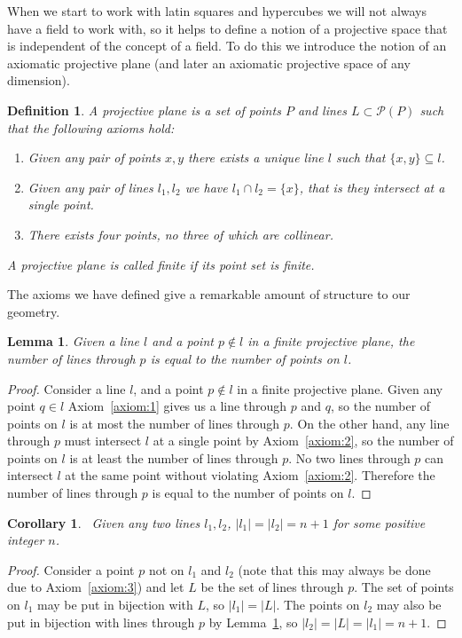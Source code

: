 \documentclass{article}
\newtheorem{lemma}{Lemma}
\newtheorem{corollary}{Corollary}
\newtheorem{definition}{Definition}
\begin{document}
When we start to work with latin squares and hypercubes we will not always have a field to work with, so it helps to define a notion of a projective space that is independent of the concept of a field. To do this we introduce the notion of an axiomatic projective plane (and later an axiomatic projective space of any dimension).

\begin{definition}
  A \textit{projective plane} is a set of points \(P\) and lines \(L \subset \mathcal{P}(P)\) such that the following axioms hold:

  \begin{enumerate}
    \item Given any pair of points \(x, y\) there exists a unique line \(l\) such that \(\{x, y\} \subseteq l\).\label{axiom:1}
    \item Given any pair of lines \(l_1, l_2\) we have \(l_1 \cap l_2 = \{x\}\), that is they intersect at a single point.\label{axiom:2}
    \item There exists four points, no three of which are collinear.\label{axiom:3}
  \end{enumerate}

  A projective plane is called finite if its point set is finite.
\end{definition}


The axioms we have defined give a remarkable amount of structure to our geometry.

\begin{lemma}\label{lemma:p-l-bijection}
  Given a line \(l\) and a point \(p \notin l\) in a finite projective plane, the number of lines through \(p\) is equal to the number of points on \(l\).
\end{lemma}
\begin{proof}
  Consider a line \(l\), and a point \(p \notin l\) in a finite projective plane. Given any point \(q \in l\) Axiom~\ref{axiom:1} gives us a line through \(p\) and \(q\), so the number of points on \(l\) is at most the number of lines through \(p\). On the other hand,
  any line through \(p\) must intersect \(l\) at a single point by Axiom~\ref{axiom:2}, so the number of points on \(l\) is at least the number of lines through \(p\). No two lines through \(p\) can intersect \(l\) at the same point without violating Axiom~\ref{axiom:2}. Therefore the number of lines through \(p\) is equal to the number of points on \(l\).
\end{proof}

\begin{corollary}~\label{cor:line-count}
  Given any two lines \(l_1, l_2\), \(|l_1| = |l_2| = n + 1\) for some positive integer \(n\).
\end{corollary}
\begin{proof}
  Consider a point \(p\) not on \(l_1\) and \(l_2\) (note that this may always be done due to Axiom~\ref{axiom:3}) and let \(L\) be the set of lines through \(p\). The set of points on \(l_{1}\) may be put in bijection with \(L\), so \(|l_{1}| = |L|\). The points on \(l_2\) may also be put in bijection with lines through \(p\) by Lemma~\ref{lemma:p-l-bijection},
  so \(|l_2| = |L| = |l_1| = n + 1\).
\end{proof}
\end{document}
